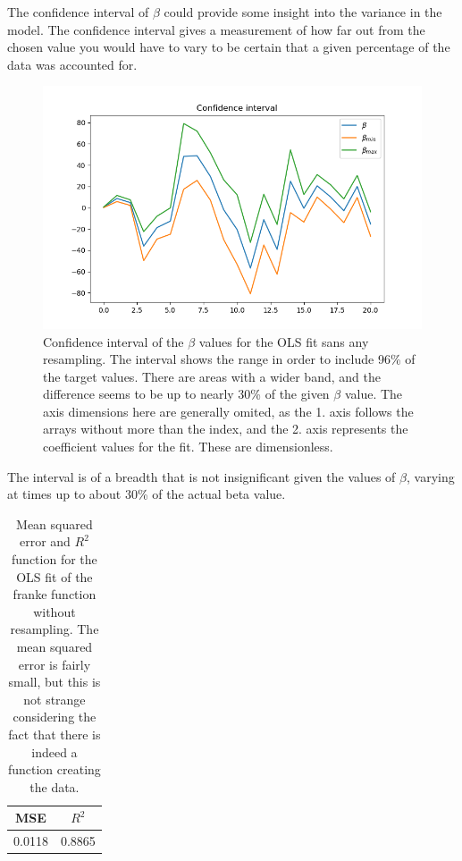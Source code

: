 \documentclass[ 12pt, a4paper ]{article}
\begin{document}
The confidence interval of $\beta$ could provide some insight into the variance in the model. 
The confidence interval gives a measurement of how far out from the chosen value you would have 
to vary to be certain that a given percentage of the data was accounted for. 

\begin{figure}
\includegraphics[scale=0.7]{frankeci.png}
\caption{
    Confidence interval of the $\beta$ values for the OLS fit sans any resampling. 
    The interval shows the range in order to include 96\% of the target values. There are 
    areas with a wider band, and the difference seems to be up to nearly 30\% of the given 
    $\beta$ value. The axis dimensions here are generally omited, as the 1. axis follows the 
    arrays without more than the index, and the 2. axis represents the coefficient values for
    the fit. These are dimensionless. 
}
\label{fig:frankeolsci}
\end{figure}

The interval is of a breadth that is not insignificant given the values of $\beta$, varying at 
times up to about 30\% of the actual beta value.

\begin{table}[H]
\centering
\begin{tabular}{ || c | c ||}
\hline
\hline
MSE & $R^2$ \\          %
\hline                  %
0.0118 & 0.8865 \\      %
\hline
\hline
\end{tabular} 
\caption{
    Mean squared error and $R^2$ function for the OLS fit of the franke function without 
    resampling. The mean squared error is fairly small, but this is not strange considering
    the fact that there is indeed a function creating the data. 
}
\label{tab:frankeolserror}
\end{table}
\end{document}
